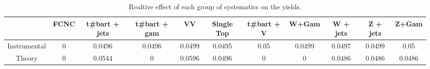 \begin{table}[htbp]
\begin{center}
\begin{tabular}{|c|c|c|c|c|c|c|c|c|c|c|}
\hline 
      & FCNC      & t#bar{t} + jets      & t#bar{t} +  gam      & VV      & Single Top      & t#bar{t} + V      & W+Gam      & W + jets      & Z + jets      & Z+Gam \\ 
\hline 
 Instrumental & 0 & 0.0496 & 0.0496 & 0.0499 & 0.0495 & 0.05 & 0.0499 & 0.0497 & 0.0499 & 0.05 \\ 
 Theory & 0 & 0.0544 & 0 & 0.0596 & 0.0496 & 0 & 0 & 0.0486 & 0.0486 & 0.0486 \\ 
\hline 
\end{tabular} 
\caption{Realtive effect of each group of systematics on the yields.} 
\end{center} 
\end{table} 
